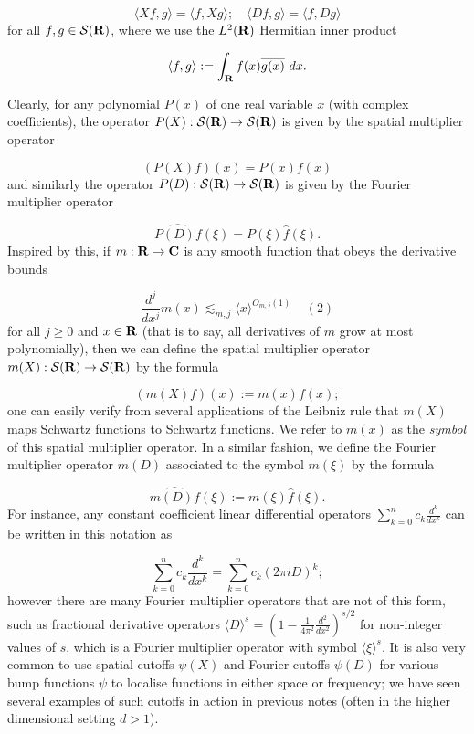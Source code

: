 \documentclass[11pt]{article}
\theoremstyle{definition}
\theoremstyle{remark}
\begin{document}
\[\displaystyle  \langle Xf, g \rangle = \langle f, Xg \rangle; \quad \langle Df, g \rangle = \langle f, Dg \rangle\]
 for all \({f,g \in {\mathcal S}({\bf R})}\), where we use the \({L^2({\bf R})}\) Hermitian inner product 

\[\displaystyle  \langle f, g\rangle := \int_{\bf R} f(x) \overline{g(x)}\ dx.\]

Clearly, for any polynomial \({P(x)}\) of one real variable \({x}\) (with complex coefficients), the operator \({P(X): {\mathcal S}({\bf R}) \rightarrow {\mathcal S}({\bf R})}\) is given by the spatial multiplier operator 

\[\displaystyle  (P(X) f)(x) = P(x) f(x)\]
 and similarly the operator \({P(D): {\mathcal S}({\bf R}) \rightarrow {\mathcal S}({\bf R})}\) is given by the Fourier multiplier operator 

\[\displaystyle  \widehat{P(D) f}(\xi) = P(\xi) \hat f(\xi).\]
 Inspired by this, if \({m: {\bf R} \rightarrow {\bf C}}\) is any smooth function that obeys the derivative bounds \label{deriv}

\[\displaystyle  \frac{d^j}{dx^j} m(x) \lesssim_{m,j} \langle x \rangle^{O_{m,j}(1)} \ \ \ \ \ (2)\]
 for all \({j \geq 0}\) and \({x \in {\bf R}}\) (that is to say, all derivatives of \({m}\) grow at most polynomially), then we can define the spatial multiplier operator \({m(X): {\mathcal S}({\bf R}) \rightarrow {\mathcal S}({\bf R})}\) by the formula 

\[\displaystyle  (m(X) f)(x) := m(x) f(x);\]
 one can easily verify from several applications of the Leibniz rule that \({m(X)}\) maps Schwartz functions to Schwartz functions. We refer to \({m(x)}\) as the \emph{symbol} of this spatial multiplier operator. In a similar fashion, we define the Fourier multiplier operator \({m(D)}\) associated to the symbol \({m(\xi)}\) by the formula 

\[\displaystyle  \widehat{m(D) f}(\xi) := m(\xi) \hat f(\xi).\]
 For instance, any constant coefficient linear differential operators \({\sum_{k=0}^n c_k \frac{d^k}{dx^k}}\) can be written in this notation as 

\[\displaystyle \sum_{k=0}^n c_k \frac{d^k}{dx^k} =\sum_{k=0}^n c_k (2\pi i D)^k;\]
 however there are many Fourier multiplier operators that are not of this form, such as fractional derivative operators \({\langle D \rangle^s = (1- \frac{1}{4\pi^2} \frac{d^2}{dx^2})^{s/2}}\) for non-integer values of \({s}\), which is a Fourier multiplier operator with symbol \({\langle \xi \rangle^s}\). It is also very common to use spatial cutoffs \({\psi(X)}\) and Fourier cutoffs \({\psi(D)}\) for various bump functions \({\psi}\) to localise functions in either space or frequency; we have seen several examples of such cutoffs in action in previous notes (often in the higher dimensional setting \({d>1}\)).
\end{document}
